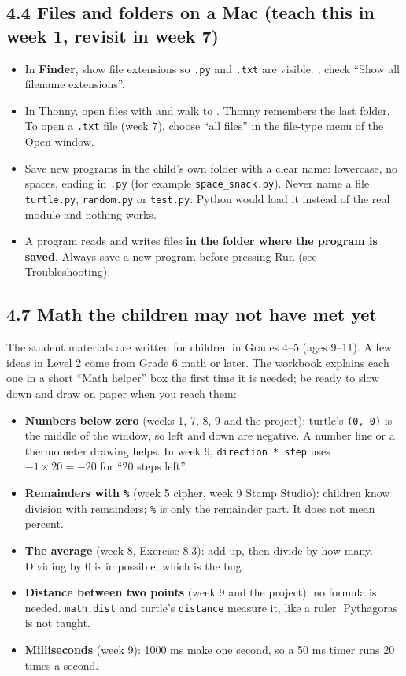 \documentclass[level=2,teacher]{kidscode}
\begin{document}
\subsection{4.4 Files and folders on a Mac (teach this in week 1, revisit in week 7)}
\begin{itemize}[itemsep=1pt]
  \item In \textbf{Finder}, show file extensions so \texttt{.py} and \texttt{.txt} are visible:
        , check \enquote{Show all filename extensions}.
  \item In Thonny, open files with  and walk to
        .
        Thonny remembers the last folder. To open a \texttt{.txt} file (week 7), choose \enquote{all files} in the
        file-type menu of the Open window.
  \item Save new programs in the child's own folder with a clear name: lowercase, no spaces,
        ending in \texttt{.py} (for example \texttt{space\_snack.py}). Never name a file
        \texttt{turtle.py}, \texttt{random.py} or \texttt{test.py}: Python would load it instead of
        the real module and nothing works.
  \item A program reads and writes files \textbf{in the folder where the program is saved}. Always
        save a new program before pressing Run (see Troubleshooting).
\end{itemize}

\subsection{4.7 Math the children may not have met yet}
The student materials are written for children in Grades 4--5 (ages 9--11). A few ideas in Level 2 come
from Grade 6 math or later. The workbook explains each one in a short \enquote{Math helper} box the first
time it is needed; be ready to slow down and draw on paper when you reach them:
\begin{itemize}[itemsep=1pt]
  \item \textbf{Numbers below zero} (weeks 1, 7, 8, 9 and the project): turtle's \texttt{(0, 0)} is the middle of the
        window, so left and down are negative. A number line or a thermometer drawing helps. In week 9,
        \texttt{direction * step} uses $-1 \times 20 = -20$ for \enquote{20 steps left}.
  \item \textbf{Remainders with \texttt{\%}} (week 5 cipher, week 9 Stamp Studio): children know division with
        remainders; \texttt{\%} is only the remainder part. It does not mean percent.
  \item \textbf{The average} (week 8, Exercise 8.3): add up, then divide by how many. Dividing by 0 is impossible,
        which is the bug.
  \item \textbf{Distance between two points} (week 9 and the project): no formula is needed. \texttt{math.dist} and
        turtle's \texttt{distance} measure it, like a ruler. Pythagoras is not taught.
  \item \textbf{Milliseconds} (week 9): 1000 ms make one second, so a 50 ms timer runs 20 times a second.
\end{itemize}
\end{document}
